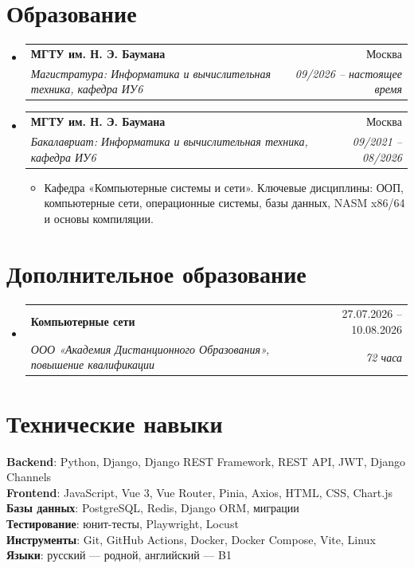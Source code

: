 \documentclass[a4paper,10pt]{article}
\makeatletter
\newcommand{\resumeItem}[1]{
  \item\small{{#1 \vspace{-2pt}}}
}
\newcommand{\resumeSubheading}[4]{
  \vspace{-2pt}\item
    \begin{tabular*}{0.97\textwidth}[t]{l@{\extracolsep{\fill}}r}
      \textbf{#1} & #2 \\
      \textit{\small #3} & \textit{\small #4} \\
    \end{tabular*}\vspace{-7pt}
}
\newcommand{\resumeSubHeadingListStart}{\begin{itemize}[leftmargin=0.15in,label={}]}
\newcommand{\resumeSubHeadingListEnd}{\end{itemize}}
\newcommand{\resumeItemListStart}{\begin{itemize}[leftmargin=0.22in]}
\newcommand{\resumeItemListEnd}{\end{itemize}\vspace{-5pt}}
\makeatother
\begin{document}
\section{Образование}
\resumeSubHeadingListStart
  \resumeSubheading
    {МГТУ им. Н. Э. Баумана}{Москва}
    {Магистратура: Информатика и вычислительная техника, кафедра ИУ6}{09/2026 -- настоящее время}
  \resumeSubheading
    {МГТУ им. Н. Э. Баумана}{Москва}
    {Бакалавриат: Информатика и вычислительная техника, кафедра ИУ6}{09/2021 -- 08/2026}
    \resumeItemListStart
      \resumeItem{Кафедра «Компьютерные системы и сети». Ключевые дисциплины: ООП, компьютерные сети, операционные системы, базы данных, NASM x86/64 и основы компиляции.}
    \resumeItemListEnd
\resumeSubHeadingListEnd

\section{Дополнительное образование}
\resumeSubHeadingListStart
  \resumeSubheading
    {Компьютерные сети}{27.07.2026 -- 10.08.2026}
    {ООО «Академия Дистанционного Образования», повышение квалификации}{72 часа}
\resumeSubHeadingListEnd

\section{Технические навыки}
\begin{itemize}[leftmargin=0.15in,label={}]
  \small{\item{
    \textbf{Backend}{: Python, Django, Django REST Framework, REST API, JWT, Django Channels} \\
    \textbf{Frontend}{: JavaScript, Vue 3, Vue Router, Pinia, Axios, HTML, CSS, Chart.js} \\
    \textbf{Базы данных}{: PostgreSQL, Redis, Django ORM, миграции} \\
    \textbf{Тестирование}{: юнит-тесты, Playwright, Locust} \\
    \textbf{Инструменты}{: Git, GitHub Actions, Docker, Docker Compose, Vite, Linux} \\
    \textbf{Языки}{: русский --- родной, английский --- B1}
  }}
\end{itemize}
\end{document}
